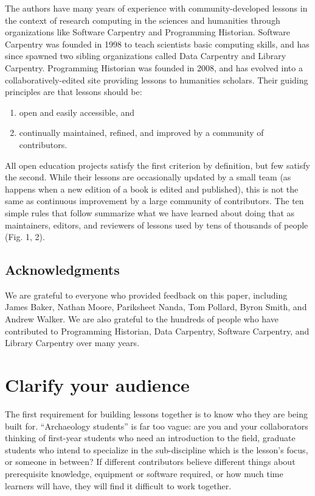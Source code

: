 \documentclass[10pt,letterpaper]{article}
\newcommand{\rulemajor}[2]{\section{#1}\label{#2}}
\begin{document}
The authors have many years of experience with community-developed lessons
in the context of research computing in the sciences and humanities
through organizations like Software Carpentry and Programming Historian.
Software Carpentry was founded in 1998 to teach scientists basic computing skills,
and has since spawned two sibling organizations called Data Carpentry and Library Carpentry.
Programming Historian was founded in 2008,
and has evolved into a collaboratively-edited site providing lessons to humanities scholars.
Their guiding principles are that lessons should be:

\begin{enumerate}

\item
  open and easily accessible, and

\item
  continually maintained, refined, and improved
  by a community of contributors.

\end{enumerate}

All open education projects satisfy the first criterion by definition,
but few satisfy the second.
While their lessons are occasionally updated by a small team
(as happens when a new edition of a book is edited and published),
this is not the same as continuous improvement by a large community of contributors.
The ten simple rules that follow summarize what we have learned about doing that
as maintainers, editors, and reviewers of lessons used by tens of thousands of people (Fig. 1, 2).

\subsection*{Acknowledgments}

We are grateful to everyone who provided feedback on this paper,
including
James Baker,
Nathan Moore,
Pariksheet Nanda,
Tom Pollard,
Byron Smith,
and Andrew Walker.
We are also grateful to the hundreds of people who have contributed to
Programming Historian, Data Carpentry, Software Carpentry, and Library Carpentry
over many years.

\rulemajor{Clarify your audience}{audience}

The first requirement for building lessons together is
to know who they are being built for.
``Archaeology students'' is far too vague:
are you and your collaborators thinking of
first-year students who need an introduction to the field,
graduate students who intend to specialize in the sub-discipline which is the lesson's focus,
or someone in between?
If different contributors believe different things about prerequisite knowledge,
equipment or software required,
or how much time learners will have,
they will find it difficult to work together.
\end{document}
